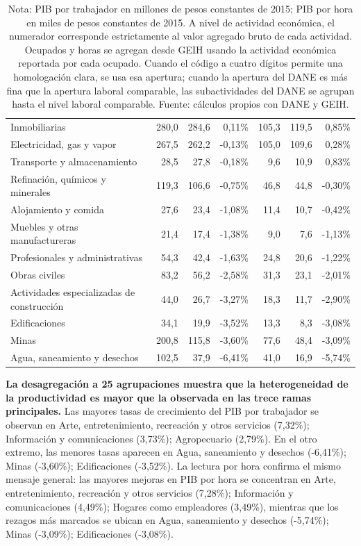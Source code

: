 \begin{table}[H]
\begin{tabular}{p{}rrrrrr}
Inmobiliarias & 280,0 & 284,6 & 0,11\% & 105,3 & 119,5 & 0,85\% \\
Electricidad, gas y vapor & 267,5 & 262,2 & -0,13\% & 105,0 & 109,6 & 0,28\% \\
Transporte y almacenamiento & 28,5 & 27,8 & -0,18\% & 9,6 & 10,9 & 0,83\% \\
Refinación, químicos y minerales & 119,3 & 106,6 & -0,75\% & 46,8 & 44,8 & -0,30\% \\
Alojamiento y comida & 27,6 & 23,4 & -1,08\% & 11,4 & 10,7 & -0,42\% \\
Muebles y otras manufactureras & 21,4 & 17,4 & -1,38\% & 9,0 & 7,6 & -1,13\% \\
Profesionales y administrativas & 54,3 & 42,4 & -1,63\% & 24,8 & 20,6 & -1,22\% \\
Obras civiles & 83,2 & 56,2 & -2,58\% & 31,3 & 23,1 & -2,01\% \\
Actividades especializadas de construcción & 44,0 & 26,7 & -3,27\% & 18,3 & 11,7 & -2,90\% \\
Edificaciones & 34,1 & 19,9 & -3,52\% & 13,3 & 8,3 & -3,08\% \\
Minas & 200,8 & 115,8 & -3,60\% & 77,6 & 48,4 & -3,09\% \\
Agua, saneamiento y desechos & 102,5 & 37,9 & -6,41\% & 41,0 & 16,9 & -5,74\% \\
\bottomrule
\end{tabular}
\caption*{\footnotesize Nota: PIB por trabajador en millones de pesos constantes de 2015; PIB por hora en miles de pesos constantes de 2015. A nivel de actividad económica, el numerador corresponde estrictamente al valor agregado bruto de cada actividad. Ocupados y horas se agregan desde GEIH usando la actividad económica reportada por cada ocupado. Cuando el código a cuatro dígitos permite una homologación clara, se usa esa apertura; cuando la apertura del DANE es más fina que la apertura laboral comparable, las subactividades del DANE se agrupan hasta el nivel laboral comparable. Fuente: cálculos propios con DANE y GEIH.}
\end{table}

\textbf{La desagregación a 25 agrupaciones muestra que la heterogeneidad de la productividad es mayor que la observada en las trece ramas principales.} Las mayores tasas de crecimiento del PIB por trabajador se observan en Arte, entretenimiento, recreación y otros servicios (7,32\%); Información y comunicaciones (3,73\%); Agropecuario (2,79\%). En el otro extremo, las menores tasas aparecen en Agua, saneamiento y desechos (-6,41\%); Minas (-3,60\%); Edificaciones (-3,52\%). La lectura por hora confirma el mismo mensaje general: las mayores mejoras en PIB por hora se concentran en Arte, entretenimiento, recreación y otros servicios (7,28\%); Información y comunicaciones (4,49\%); Hogares como empleadores (3,49\%), mientras que los rezagos más marcados se ubican en Agua, saneamiento y desechos (-5,74\%); Minas (-3,09\%); Edificaciones (-3,08\%).

